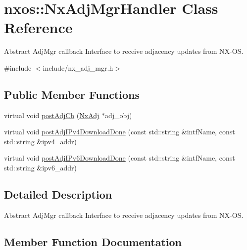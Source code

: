 \hypertarget{classnxos_1_1_nx_adj_mgr_handler}{}\section{nxos\+:\+:Nx\+Adj\+Mgr\+Handler Class Reference}
\label{classnxos_1_1_nx_adj_mgr_handler}


Abstract Adj\+Mgr callback Interface to receive adjacency updates from N\+X-\/\+OS.  




{\ttfamily \#include $<$include/nx\+\_\+adj\+\_\+mgr.\+h$>$}

\subsection*{Public Member Functions}
\begin{DoxyCompactItemize}
\item 
virtual void \mbox{\hyperlink{classnxos_1_1_nx_adj_mgr_handler_a9a1f85f218eab71d9c280088f69a14dc}{post\+Adj\+Cb}} (\mbox{\hyperlink{classnxos_1_1_nx_adj}{Nx\+Adj}} $\ast$adj\+\_\+obj)
\item 
virtual void \mbox{\hyperlink{classnxos_1_1_nx_adj_mgr_handler_a84d9b92c976ae528c72e93ab3a75ecd1}{post\+Adj\+I\+Pv4\+Download\+Done}} (const std\+::string \&intf\+Name, const std\+::string \&ipv4\+\_\+addr)
\item 
virtual void \mbox{\hyperlink{classnxos_1_1_nx_adj_mgr_handler_af187f3d933d1b58547447004e4aebef6}{post\+Adj\+I\+Pv6\+Download\+Done}} (const std\+::string \&intf\+Name, const std\+::string \&ipv6\+\_\+addr)
\end{DoxyCompactItemize}


\subsection{Detailed Description}
Abstract Adj\+Mgr callback Interface to receive adjacency updates from N\+X-\/\+OS. 

\subsection{Member Function Documentation}
\mbox{\label{classnxos_1_1_nx_adj_mgr_handler_a9a1f85f218eab71d9c280088f69a14dc}} 
